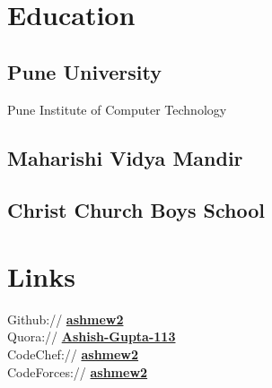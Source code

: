 \documentclass[letterpaper]{deedy-resume} %
\begin{document}
\lastupdated %
\begin{minipage}[t]{0.33\textwidth} %
\section{Education}
\subsection{Pune University}
Pune Institute of Computer Technology \\
\sectionspace %
\subsection{Maharishi Vidya Mandir}
\sectionspace %
\subsection{Christ Church Boys School}
\sectionspace %
\section{Links}
Github:// \href{https://github.com/ashmew2}{\bf ashmew2} \\
Quora:// \href{http://www.quora.com/Ashish-Gupta-113}{\bf Ashish-Gupta-113} \\
CodeChef:// \href{http://www.codechef.com/users/ashmew2}{\bf ashmew2} \\
CodeForces:// \href{http://codeforces.com/profile/ashmew2}{\bf ashmew2} \\
\sectionspace %

\end{minipage}
\end{document}
